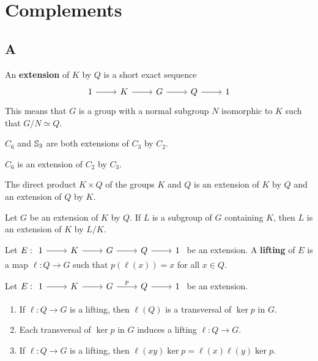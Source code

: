 \chapter{Complements}
\label{cocycles}

\section*{A}


An \textbf{extension} of $K$ by $Q$ is a
short exact sequence 
\[
\begin{tikzcd}
	1 & K & G & Q & 1
	\arrow[from=1-1, to=1-2]
	\arrow[from=1-2, to=1-3]
	\arrow[from=1-3, to=1-4]
	\arrow[from=1-4, to=1-5]
\end{tikzcd}
\]
This means that $G$ is a group with a normal subgroup 
$N$ isomorphic to $K$ such that $G/N\simeq Q$. 

\begin{example}
	$C_6$ and $\mathbb{S}_3$ are both extensions of $C_3$ by $C_2$.
\end{example}

\begin{example}
	$C_6$ is an extension of $C_2$ by $C_3$.
\end{example}

\begin{example}
    The direct product $K\times Q$ of the groups $K$ and $Q$ 
    is an extension of $K$ by $Q$ and an extension of $Q$ by $K$. 
\end{example}

\begin{example}
Let $G$ be an extension of $K$ by $Q$. If $L$ is a subgroup of $G$ containing $K$, 
then $L$ is an extension
of $K$ by $L/K$.
\end{example}

Let $E:
\begin{tikzcd}
	1 & K & G & Q & 1
	\arrow[from=1-1, to=1-2]
	\arrow[from=1-2, to=1-3]
	\arrow[from=1-3, to=1-4]
	\arrow[from=1-4, to=1-5]
\end{tikzcd}$
be an extension. A \textbf{lifting} of $E$ is a map $\ell\colon
Q\to G$ such that $p(\ell(x))=x$ for all $x\in Q$. 

\begin{exercise}
	\label{xca:lifting}
	Let $E:
	\begin{tikzcd}
	1 & K & G & Q & 1
	\arrow[from=1-1, to=1-2]
	\arrow[from=1-2, to=1-3]
	\arrow["p", from=1-3, to=1-4]
	\arrow[from=1-4, to=1-5]
    \end{tikzcd}$
	be an extension. 
	\begin{enumerate}
		\item If $\ell\colon Q\to G$ is a lifting, then $\ell(Q)$
			is a transversal of $\ker p$ in $G$.
		\item Each transversal of $\ker p$ in $G$ induces a lifting $\ell\colon
			Q\to G$.
		\item If $\ell\colon Q\to G$ is a lifting, then 
			$\ell(xy)\ker p=\ell(x)\ell(y)\ker p$.
	\end{enumerate}
\end{exercise}

